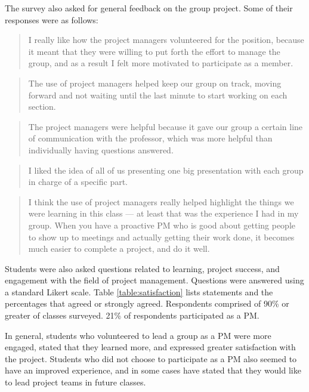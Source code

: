 \documentclass{sig-alternate}
\begin{document}
The survey also asked for general feedback on the group project. Some of their responses were as
follows:

\begin{quotation}I really like how the project managers volunteered for the position, because it meant that they
were willing to put forth the effort to manage the group, and as a result I felt more motivated to
participate as a member.\end{quotation}

\begin{quotation}The use of project managers helped keep our group on track, moving forward and not waiting
until the last minute to start working on each section.\end{quotation}

\begin{quotation}The project managers were helpful because it gave our group a certain line of communication
with the professor, which was more helpful than individually having questions answered.\end{quotation}

\begin{quotation}I liked the idea of all of us presenting one big presentation with each group in charge of a
specific part.\end{quotation}

\begin{quotation}I think the use of project managers really helped highlight the things we were learning in this
class --- at least that was the experience I had in my group. When you have a proactive PM who is
good about getting people to show up to meetings and actually getting their work done, it becomes
much easier to complete a project, and do it well.\end{quotation}

Students were also asked questions related to learning, project success, and engagement with the field
of project management. Questions were answered using a standard Likert scale. Table \ref{table:satisfaction} lists
statements and the percentages that agreed or strongly agreed. Respondents comprised of 90\% or greater of classes
surveyed. 21\% of respondents participated as a PM.

In general, students who volunteered to lead a group as a PM were more engaged, stated that they
learned more, and expressed greater satisfaction with the project. Students who did not choose to
participate as a PM also seemed to have an improved experience, and in some cases have stated that they
would like to lead project teams in future classes.
\end{document}
